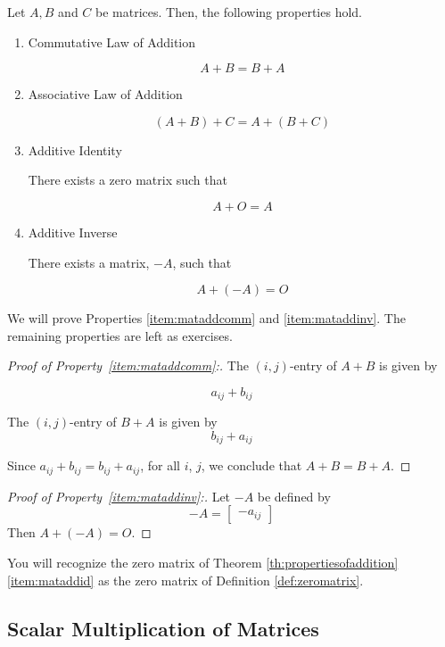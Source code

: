 \documentclass{ximera}
\begin{document}
\begin{theorem}\label{th:propertiesofaddition}
Let $A,B$ and $C$ be matrices. Then, the following properties  hold. 

\begin{enumerate}
\item\label{item:mataddcomm} Commutative Law of Addition

$$A+B=B+A$$  


\item \label{item:mataddass} Associative Law of Addition

$$\left( A+B\right) +C=A+\left( B+C\right) $$


\item\label{item:mataddid} Additive Identity
\begin{center}
There exists a zero matrix such that
\end{center}
$$A+O=A$$


\item\label{item:mataddinv} Additive Inverse
\begin{center}
There exists a matrix, $-A$, such that
\end{center}
$$A+\left( -A\right) =O $$

\end{enumerate}
\end{theorem}
We will prove Properties \ref{item:mataddcomm} and \ref{item:mataddinv}.  The remaining properties are left as exercises.
\begin{proof}[Proof of Property~\ref{item:mataddcomm}:]
The $(i,j)$-entry of $A+B$ is given by

$$a_{ij}+b_{ij}$$

The $(i,j)$-entry of $B+A$ is given by
$$b_{ij}+a_{ij}$$

Since $a_{ij}+b_{ij}=b_{ij}+a_{ij}$, for all $i$, $j$, we conclude that $A+B=B+A$.
\end{proof}

\begin{proof}[Proof of Property~\ref{item:mataddinv}:]
Let $-A$ be defined by
$$-A=\begin{bmatrix}-a_{ij}\end{bmatrix}$$
Then $A+(-A)=O$.
\end{proof}

You will recognize the zero matrix of Theorem \ref{th:propertiesofaddition}\ref{item:mataddid} as the zero matrix of Definition \ref{def:zeromatrix}. 

\subsection*{Scalar Multiplication of Matrices}
\end{document}
